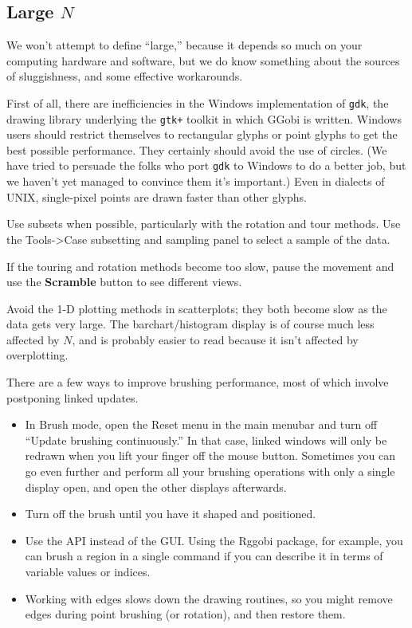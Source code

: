 \documentclass[11pt]{article}
\def\Widget#1{\textbf{#1}}
\begin{document}
{\subsection{Large $N$}

We won't attempt to define ``large,'' because it depends so much on
your computing hardware and software, but we do know something about
the sources of sluggishness, and some effective workarounds.

First of all, there are inefficiencies in the Windows implementation
of \verb|gdk|, the drawing library underlying the \verb|gtk+| toolkit
in which GGobi is written.  Windows users should restrict themselves to
rectangular glyphs or point glyphs to get the best possible performance.
They certainly should avoid the use of circles.  (We have tried to
persuade the folks who port \verb|gdk| to Windows to do a better job,
but we haven't yet managed to convince them it's important.)  Even in
dialects of UNIX, single-pixel points are drawn faster than other glyphs.

Use subsets when possible, particularly with the rotation and tour
methods.  Use the Tools->Case subsetting and sampling panel to select
a sample of the data.

If the touring and rotation methods become too slow, pause the movement
and use the \Widget{Scramble} button to see different views.

Avoid the 1-D plotting methods in scatterplots; they both become slow
as the data gets very large.  The barchart/histogram display is of course
much less affected by $N$, and is probably easier to read because it
isn't affected by overplotting.

There are a few ways to improve brushing performance, most of which
involve postponing linked updates.  
\begin{itemize}
\item In Brush mode, open the Reset menu in the main menubar and turn off
 ``Update brushing continuously.''  In that case, linked windows will only
 be redrawn when you lift your finger off the mouse button.  Sometimes you
 can go even further and perform all your brushing operations with only
 a single display open, and open the other displays afterwards.
\item Turn off the brush until you have it shaped and positioned.
\item Use the API instead of the GUI.  Using the Rggobi package, for
 example, you can brush a region in a single command if you can describe
 it in terms of variable values or indices.
\item Working with edges slows down the drawing routines, so you might
 remove edges during point brushing (or rotation), and then restore them.
\end{itemize}

}
\end{document}
